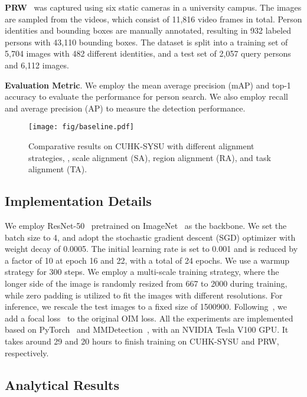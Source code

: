 \documentclass[final]{cvpr}
\begin{document}
\textbf{PRW}~\cite{DBLP:conf/cvpr/ZhengZSCYT17} was captured using six static cameras in a university campus.
The images are sampled from the videos, which consist of 11,816 video frames in total. Person identities and bounding boxes are manually annotated, resulting in 932 labeled persons with 43,110 bounding boxes. The dataset is split into a training set of 5,704 images with 482 different identities, and a test set of 2,057 query persons and 6,112 images. 

\textbf{Evaluation Metric}. We employ the mean average precision (mAP) and top-1 accuracy to evaluate the performance for person search. We also employ recall and average precision (AP) to measure the detection performance.


\begin{figure}[t]
\setlength{\abovecaptionskip}{1mm}
\centering
\texttt{[image: fig/baseline.pdf]}
\caption{Comparative results on CUHK-SYSU with different alignment strategies, \ie, scale alignment (SA), region alignment (RA), and task alignment (TA).}
\label{fig:baseline}
\end{figure}


\subsection{Implementation Details}
We employ ResNet-50~\cite{DBLP:conf/cvpr/HeZRS16} pretrained on ImageNet~\cite{DBLP:conf/cvpr/DengDSLL009} as the backbone. 
We set the batch size to 4, and adopt the stochastic gradient descent (SGD) optimizer with weight decay of 0.0005. The initial learning rate is set to 0.001 and is reduced by a factor of 10 at epoch 16 and 22, with a total of 24 epochs. We use a warmup strategy for 300 steps. We employ a multi-scale training strategy, where the longer side of the image is randomly resized from 667 to 2000 during training, while zero padding is utilized to fit the images with different resolutions. For inference, we rescale the test images to a fixed size of 1500900. Following~\cite{DBLP:conf/aaai/ChenZO0S20}, we add a focal loss~\cite{DBLP:conf/iccv/LinGGHD17} to the original OIM loss.
All the experiments are implemented based on PyTorch~\cite{DBLP:conf/nips/PaszkeGMLBCKLGA19} and MMDetection~\cite{DBLP:journals/corr/abs-1906-07155}, with an NVIDIA Tesla V100 GPU. It takes around 29 and 20 hours to finish training on CUHK-SYSU and PRW, respectively.

\subsection{Analytical Results}\label{sec:analytical}
\end{document}
